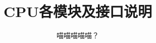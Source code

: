 \documentclass{article}
\title{CPU各模块及接口说明}
\author{喵喵喵喵喵？}
\begin{document}
\begin{comment}
普通的tabular环境：
\begin{table}
    \centering
    \small
    \begin{tabular}{lllllp{2cm}}
    \toprule
    方向 & 名称 & 类型 & 宽度 & 连接到 & 详细描述 \\ \midrule
    in & rst\label{REGISTERS:rst} & STD_LOGIC & 1 & \nameref{sec:MIPS_CPU} & 复位信号 \\
    in & clk\label{REGISTERS:clk} & STD_LOGIC & 1 & \nameref{sec:MIPS_CPU} & 时钟信号 \\

    \bottomrule
    \end{tabular}
    \caption {PC的接口}
\end{table}

可以换页的tabular环境：
\begin{center}
    \tablecaption{PC的接口}

    \tablefirsthead{
        \toprule
        \multicolumn{1}{l}{方向} &
        \multicolumn{1}{l}{名称} &
        \multicolumn{1}{l}{类型} &
        \multicolumn{1}{l}{宽度} &
        \multicolumn{1}{l}{连接到} &
        \multicolumn{1}{l}{详细描述} \\
        \midrule }

    \tablehead{
        \toprule
        \multicolumn{1}{l}{方向} &
        \multicolumn{1}{l}{名称} &
        \multicolumn{1}{l}{类型} &
        \multicolumn{1}{l}{宽度} &
        \multicolumn{1}{l}{连接到} &
        \multicolumn{1}{l}{详细描述} \\
        \midrule }

    \tabletail{
        \bottomrule
        \multicolumn{6}{c}{接下页} \\}

    \tablelasttail{\bottomrule}

    \small
    \begin{supertabular}{lllllp{2cm}}

    in & rst\label{REGISTERS:rst} & STD_LOGIC & 1 & \nameref{sec:MIPS_CPU} & 复位信号 \\
    in & clk\label{REGISTERS:clk} & STD_LOGIC & 1 & \nameref{sec:MIPS_CPU} & 时钟信号 \\

    \end{supertabular}
\end{center}
\end{comment}

\maketitle
\end{document}

